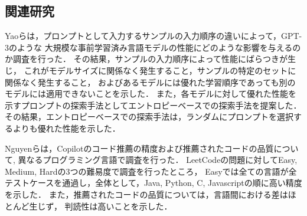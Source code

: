 \subsection{関連研究}
  Yaoら\cite{Yao2022ACL}は，プロンプトとして入力するサンプルの入力順序の違いによって，GPT-3のような
  大規模な事前学習済み言語モデルの性能にどのような影響を与えるのか調査を行った．
  その結果，サンプルの入力順序によって性能にばらつきが生じ，
  これがモデルサイズに関係なく発生すること，サンプルの特定のセットに関係なく発生すること，
  およびあるモデルには優れた学習順序であっても別のモデルには適用できないことを示した．
  また，各モデルに対して優れた性能を示すプロンプトの探索手法としてエントロピーベースでの探索手法を提案した．
  その結果，エントロピーベースでの探索手法は，ランダムにプロンプトを選択するよりも優れた性能を示した．

  Nguyen\cite{Nguyen2022MSR}らは，Copilotのコード推薦の精度および推薦されたコードの品質について,
  異なるプログラミング言語で調査を行った．
  LeetCodeの問題に対してEasy, Medium, Hardの3つの難易度で調査を行ったところ，
  Easyでは全ての言語が全テストケースを通過し，全体として，Java, Python, C, Javascriptの順に高い精度を示した．
  また，推薦されたコードの品質については，言語間における差はほとんど生じず，
  判読性は高いことを示した．


  